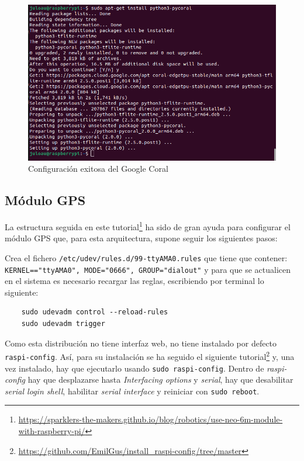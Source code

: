 \begin{figure} [h!]
	\begin{center}
		\includegraphics[width=12cm]{figs/cap6/pycoralinstalled.png}
	\end{center}
	\caption{Configuración exitosa del Google Coral}
	\label{fig:outcoral}
\end{figure} 

\subsection*{Módulo GPS}
\label{subsec:anexogps}


La estructura seguida en este tutorial\footnote{\url{https://sparklers-the-makers.github.io/blog/robotics/use-neo-6m-module-with-raspberry-pi/}} ha sido de gran ayuda para configurar el módulo \acs{GPS} que, para esta arquitectura, supone seguir los siguientes pasos: 

Crea el fichero \verb|/etc/udev/rules.d/99-ttyAMA0.rules| que tiene que contener: \verb|KERNEL=="ttyAMA0", MODE="0666", GROUP="dialout"| y para que se actualicen en el sistema es necesario recargar las reglas, escribiendo por terminal lo siguiente: 

\begin{verbatim}
	sudo udevadm control --reload-rules
	sudo udevadm trigger
\end{verbatim}

Como esta distribución no tiene interfaz web, no tiene instalado por defecto \verb|raspi-config|. Así, para su instalación se ha seguido el siguiente tutorial\footnote{\url{https://github.com/EmilGus/install_raspi-config/tree/master}} y, una vez instalado, hay que ejecutarlo usando \verb|sudo raspi-config|. Dentro de \textit{raspi-config} hay que desplazarse hasta \textit{Interfacing options} y \textit{serial}, hay que desabilitar \textit{serial login shell}, habilitar \textit{serial interface} y reiniciar con \verb|sudo reboot|.

